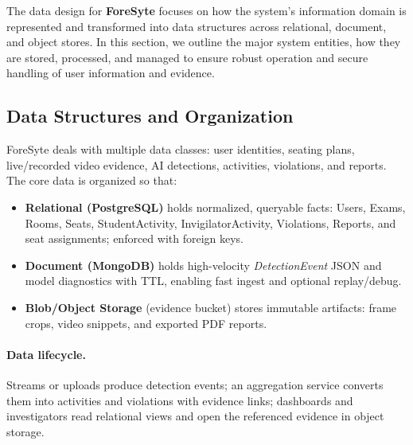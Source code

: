 The data design for \textbf{ForeSyte} focuses on how the system's information domain is represented and transformed into data structures across relational, document, and object stores. In this section, we outline the major system entities, how they are stored, processed, and managed to ensure robust operation and secure handling of user information and evidence.

\subsection{Data Structures and Organization}
ForeSyte deals with multiple data classes: user identities, seating plans, live/recorded video evidence, AI detections, activities, violations, and reports. The core data is organized so that:
\begin{itemize}
  \item \textbf{Relational (PostgreSQL)} holds normalized, queryable facts: Users, Exams, Rooms, Seats, StudentActivity, InvigilatorActivity, Violations, Reports, and seat assignments; enforced with foreign keys.
  \item \textbf{Document (MongoDB)} holds high-velocity \textit{DetectionEvent} JSON and model diagnostics with TTL, enabling fast ingest and optional replay/debug.
  \item \textbf{Blob/Object Storage} (evidence bucket) stores immutable artifacts: frame crops, video snippets, and exported PDF reports.
\end{itemize}

\paragraph{Data lifecycle.} Streams or uploads produce detection events; an aggregation service converts them into activities and violations with evidence links; dashboards and investigators read relational views and open the referenced evidence in object storage.

